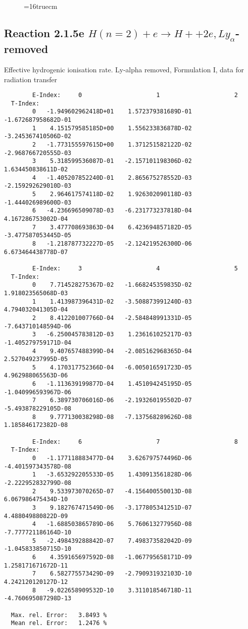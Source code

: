 \documentclass[12pt]{article}
\begin{document}
\begin{figure} \label{2.1.5d}
\epsfxsize=16truecm
\end{figure}
\newpage
\subsection{
Reaction 2.1.5e  $H(n=2) + e \rightarrow H+ + 2e, Ly_\alpha$-removed
}


   Effective hydrogenic ionisation rate. 
   Ly-alpha removed, Formulation I, data for radiation transfer

\begin{small}\begin{verbatim}
        E-Index:     0                     1                     2
  T-Index:
        0   -1.949602962418D+01    1.572379381689D-01   -1.672687958682D-01
        1    4.151579585185D+00    1.556233836878D-02   -3.245367410506D-02
        2   -1.773155597615D+00    1.371251582122D-02   -2.968766720555D-03
        3    5.318599536087D-01   -2.157101198306D-02    1.634450838611D-02
        4   -1.405207852240D-01    2.865675278552D-03   -2.159292629010D-03
        5    2.964617574118D-02    1.926302090118D-03   -1.444026989600D-03
        6   -4.236696509078D-03   -6.231773237818D-04    4.167286753002D-04
        7    3.477708693863D-04    6.423694857182D-05   -3.477587053445D-05
        8   -1.218787732227D-05   -2.124219526300D-06    6.673464438778D-07

        E-Index:     3                     4                     5
  T-Index:
        0    7.714528275367D-02   -1.668245359835D-02    1.918023565068D-03
        1    1.413987396431D-02   -3.508873991240D-03    4.794032041305D-04
        2    8.412201007766D-04   -2.584848991331D-05   -7.643710148594D-06
        3   -6.250045783812D-03    1.236161025217D-03   -1.405279759171D-04
        4    9.407657488399D-04   -2.085162968365D-04    2.527049237995D-05
        5    4.170317752366D-04   -6.005016591723D-05    4.962988065563D-06
        6   -1.113639199877D-04    1.451094245195D-05   -1.040996593967D-06
        7    6.389730706016D-06   -2.193260195502D-07   -5.493878229105D-08
        8    9.777130038298D-08   -7.137568289626D-08    1.185846172382D-08

        E-Index:     6                     7                     8
  T-Index:
        0   -1.177118883477D-04    3.626797574496D-06   -4.401597343578D-08
        1   -3.653292205533D-05    1.430913561828D-06   -2.222952832799D-08
        2    9.533973070265D-07   -4.156400550013D-08    6.067986475434D-10
        3    9.182767471549D-06   -3.177805341251D-07    4.488049880822D-09
        4   -1.688503865789D-06    5.760613277956D-08   -7.777721186164D-10
        5   -2.498439288842D-07    7.498373582042D-09   -1.045833850715D-10
        6    4.359165697592D-08   -1.067795658171D-09    1.258171671672D-11
        7    6.582775573429D-09   -2.790931932103D-10    4.242120120127D-12
        8   -9.022658909532D-10    3.311018546718D-11   -4.760695087298D-13

  Max. rel. Error:   3.8493 %
  Mean rel. Error:   1.2476 %


\end{verbatim}\end{small}
\end{document}
